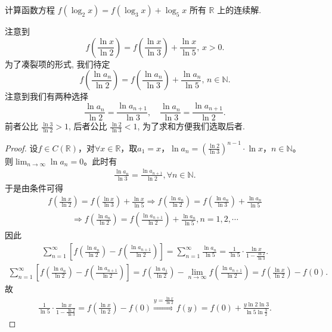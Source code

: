 \documentclass[../../main.tex]{subfiles}%
\begin{document}
\begin{example}
计算函数方程 \( f(\log_2 x) = f(\log_3 x) + \log_5 x \) 所有 \(\mathbb{R}\) 上的连续解.
\end{example}
\begin{note}
注意到
\[
f\left( \frac{\ln x}{\ln 2} \right) = f\left( \frac{\ln x}{\ln 3} \right) + \frac{\ln x}{\ln 5}, \, x > 0.
\]
为了凑裂项的形式, 我们待定
\[
f\left( \frac{\ln a_n}{\ln 2} \right) = f\left( \frac{\ln a_n}{\ln 3} \right) + \frac{\ln a_n}{\ln 5}, \, n \in \mathbb{N}.
\]
注意到我们有两种选择
\[
\frac{\ln a_n}{\ln 2} = \frac{\ln a_{n+1}}{\ln 3}, \quad \frac{\ln a_n}{\ln 3} = \frac{\ln a_{n+1}}{\ln 2}.
\]
前者公比 \(\frac{\ln 3}{\ln 2} > 1\), 后者公比 \(\frac{\ln 2}{\ln 3} < 1\), 为了求和方便我们选取后者.
\end{note}
\begin{proof}
设$f \in C(\mathbb{R})$，对$\forall x \in \mathbb{R}$，取$a_1 = x$，$\ln a_n = \left( \frac{\ln 2}{\ln 3} \right)^{n-1} \cdot \ln x$，$n \in \mathbb{N}$。则$\lim_{n \to \infty} \ln a_n = 0$。此时有
\begin{align*}
\frac{\ln a_n}{\ln 3} = \frac{\ln a_{n+1}}{\ln 2}, \forall n \in \mathbb{N}.
\end{align*}
于是由条件可得
\begin{align*}
f\left( \frac{\ln x}{\ln 2} \right) = f\left( \frac{\ln x}{\ln 3} \right) + \frac{\ln x}{\ln 5} \Rightarrow f\left( \frac{\ln a_n}{\ln 2} \right) = f\left( \frac{\ln a_n}{\ln 3} \right) + \frac{\ln a_n}{\ln 5}
\end{align*}
\begin{align*}
\Rightarrow f\left( \frac{\ln a_n}{\ln 2} \right) = f\left( \frac{\ln a_{n+1}}{\ln 2} \right) + \frac{\ln a_n}{\ln 5}, n = 1, 2, \cdots
\end{align*}
因此
\begin{align*}
\sum_{n=1}^{\infty} \left[ f\left( \frac{\ln a_n}{\ln 2} \right) - f\left( \frac{\ln a_{n+1}}{\ln 2} \right) \right] = \sum_{n=1}^{\infty} \frac{\ln a_n}{\ln 5} = \frac{1}{\ln 5} \cdot \frac{\ln x}{1 - \frac{\ln 2}{\ln 3}}.
\end{align*}
\begin{align*}
\sum_{n=1}^{\infty} \left[ f\left( \frac{\ln a_n}{\ln 2} \right) - f\left( \frac{\ln a_{n+1}}{\ln 2} \right) \right] = f\left( \frac{\ln a_1}{\ln 2} \right) - \lim_{n \to \infty} f\left( \frac{\ln a_{n+1}}{\ln 2} \right) = f\left( \frac{\ln x}{\ln 2} \right) - f(0).
\end{align*}
故
\begin{align*}
\frac{1}{\ln 5} \cdot \frac{\ln x}{1 - \frac{\ln 2}{\ln 3}} = f\left( \frac{\ln x}{\ln 2} \right) - f(0) \stackrel{y = \frac{\ln x}{\ln 2}}{\Rightarrow} f(y) = f(0) + \frac{y \ln 2 \ln 3}{\ln 5 \ln \frac{3}{2}}.
\end{align*}
\end{proof}
\end{document}
